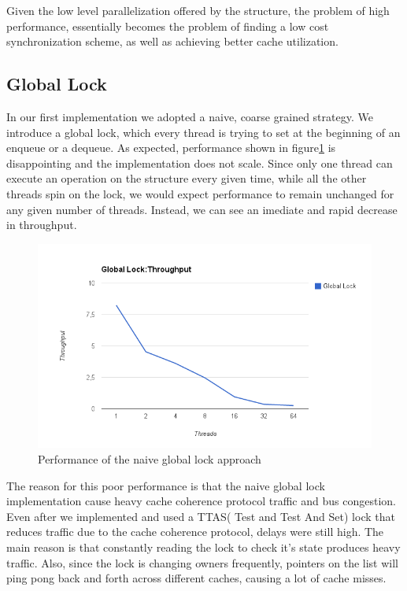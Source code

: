 Given the low level parallelization offered by the structure, the problem of high performance, essentially becomes the problem of finding a low cost synchronization scheme, as well as achieving better cache utilization.

\subsection{Global Lock}
In our first implementation we adopted a naive, coarse grained strategy. We introduce a global lock, which every thread is trying to set at the beginning of an enqueue or a dequeue. As expected,  performance shown in figure\ref{queue_global_lock_perf} is disappointing and the implementation does not scale. Since only one thread can execute an operation on the structure every given time, while all the other threads spin on the lock, we would expect performance to remain unchanged for any given number of threads. Instead, we can see an imediate and rapid decrease in throughput. %

\begin{figure}
 \centering
  \includegraphics[scale=0.7]{queue_global_lock_perf.png}
\caption{Performance of the naive global lock approach}
\label{queue_global_lock_perf}
\end{figure}


The reason for this poor performance is that the naive global lock implementation cause heavy cache coherence protocol traffic and bus congestion. Even after we implemented and used a TTAS( Test and Test And Set) lock that reduces traffic due to the cache coherence protocol, delays were still high. The main reason is that constantly reading the lock to check it's state produces heavy traffic. Also, since the lock is changing owners frequently, pointers on the list will ping pong back and forth across different caches, causing a lot of cache misses. 

